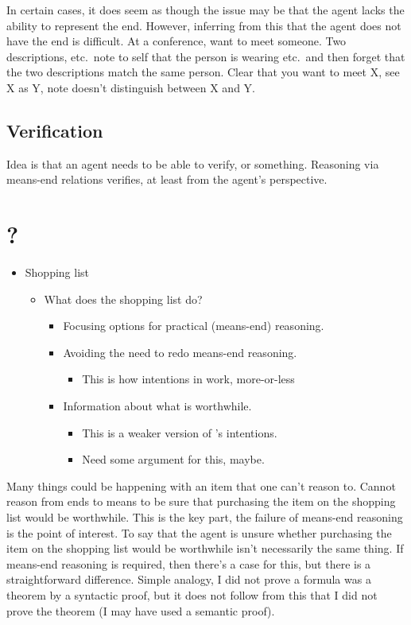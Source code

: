 \documentclass[10pt]{article}
\begin{document}
In certain cases, it does seem as though the issue may be that the agent lacks the ability to represent the end.
However, inferring from this that the agent does not have the end is difficult.
At a conference, want to meet someone.
Two descriptions, etc.\ note to self that the person is wearing etc.\ and then forget that the two descriptions match the same person.
Clear that you want to meet X, see X as Y, note doesn't distinguish between X and Y.


\subsection{Verification}
\label{sec:verification}

Idea is that an agent needs to be able to verify, or something.
Reasoning via means-end relations verifies, at least from the agent's perspective.



\section{?}

\begin{itemize}
\item Shopping list
  \begin{itemize}
  \item What does the shopping list do?
    \begin{itemize}
    \item Focusing options for practical (means-end) reasoning.
    \item Avoiding the need to redo means-end reasoning.
      \begin{itemize}
      \item This is how intentions in \textcite{Bratman:1987aa} work, more-or-less
      \end{itemize}
    \item Information about what is worthwhile.
      \begin{itemize}
      \item This is a weaker version of \citeauthor{Bratman:1987aa}'s intentions.
      \item Need some argument for this, maybe.
      \end{itemize}
    \end{itemize}
  \end{itemize}
\end{itemize}

Many things could be happening with an item that one can't reason to.
Cannot reason from ends to means to be sure that purchasing the item on the shopping list would be worthwhile.
This is the key part, the failure of means-end reasoning is the point of interest.
To say that the agent is unsure whether purchasing the item on the shopping list would be worthwhile isn't necessarily the same thing.
If means-end reasoning is required, then there's a case for this, but there is a straightforward difference.
Simple analogy, I did not prove a formula was a theorem by a syntactic proof, but it does not follow from this that I did not prove the theorem (I may have used a semantic proof).
\end{document}
